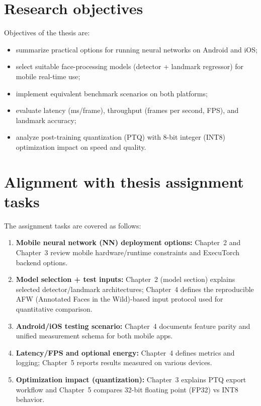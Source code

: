 \section{Research objectives}

Objectives of the thesis are:
\begin{itemize}
    \item summarize practical options for running neural networks on Android and
          iOS;
    \item select suitable face-processing models (detector + landmark regressor)
          for mobile real-time use;
    \item implement equivalent benchmark scenarios on both platforms;
    \item evaluate latency (ms/frame), throughput (frames per second, FPS), and landmark accuracy;
    \item analyze post-training quantization (PTQ) with 8-bit integer (INT8) optimization impact on speed and quality.
\end{itemize}

\section{Alignment with thesis assignment tasks}

The assignment tasks are covered as follows:
\begin{enumerate}
    \item \textbf{Mobile neural network (NN) deployment options:} Chapter~2 and Chapter~3 review
          mobile hardware/runtime constraints and ExecuTorch backend options.
    \item \textbf{Model selection + test inputs:} Chapter~2 (model section)
          explains selected detector/landmark architectures; Chapter~4 defines
          the reproducible AFW (Annotated Faces in the Wild)-based input protocol \cite{zhu2012facedetectionwild,sagonas2013_300w} used for quantitative
          comparison.
    \item \textbf{Android/iOS testing scenario:} Chapter~4 documents feature
          parity and unified measurement schema for both mobile apps.
    \item \textbf{Latency/FPS and optional energy:} Chapter~4 defines metrics
          and logging; Chapter~5 reports results measured on various devices.
    \item \textbf{Optimization impact (quantization):} Chapter~3 explains PTQ
          export workflow and Chapter~5 compares 32-bit floating point (FP32) vs INT8 behavior.
\end{enumerate}

